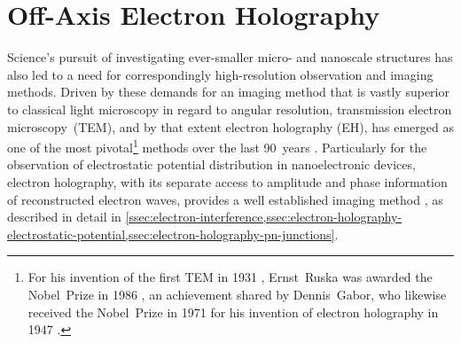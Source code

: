 \section{Off-Axis Electron Holography} \label{sec:electron-holography}
Science's pursuit of investigating ever-smaller micro- and nanoscale structures has also led to a need for correspondingly high-resolution observation and imaging methods. Driven by these demands for an imaging method that is vastly superior to classical light microscopy in regard to angular resolution, transmission electron microscopy~(TEM), and by that extent electron holography (EH), has emerged as one of the most pivotal\footnote{For his invention of the first TEM in 1931 \cite{Ruska1932-I,Ruska1932-II}, Ernst~Ruska was awarded the Nobel~Prize in 1986 \cite{Ruska1986,Robinson1986}, an achievement shared by Dennis~Gabor, who likewise received the Nobel~Prize in 1971 \cite{Gabor1971} for his invention of electron holography in 1947 \cite{Gabor1948,Gabor1949}.} methods over the last 90~years \cite{Curry2006,Kisielowski2008,Deepak2015,Franken2017,Li2019}. Particularly for the observation of electrostatic potential distribution in nanoelectronic devices, electron holography, with its separate access to amplitude and phase information of reconstructed electron waves, provides a well established imaging method \cite{Lichte1986,Tonomura1987,Cowley1992,DuninBorkowski2004}, as described in detail in \cref{ssec:electron-interference,ssec:electron-holography-electrostatic-potential,ssec:electron-holography-pn-junctions}.
